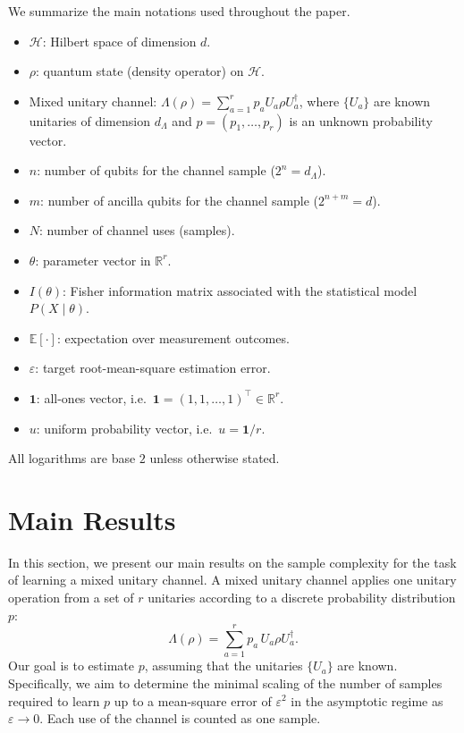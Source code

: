 \documentclass[12pt]{article}
\begin{document}
We summarize the main notations used throughout the paper.
\begin{itemize}
    \item $\mathcal{H}$: Hilbert space of dimension $d$.
    \item $\rho$: quantum state (density operator) on $\mathcal{H}$.
    \item Mixed unitary channel: $\Lambda(\rho) = \sum_{a=1}^r p_a U_a \rho U_a^\dagger$, where $\{U_a\}$ are known unitaries of dimension $d_\Lambda$ and $p = (p_1, \ldots, p_r)$ is an unknown probability vector.
    \item $n$: number of qubits for the channel sample ($2^n = d_\Lambda$).
    \item $m$: number of ancilla qubits for the channel sample ($2^{n+m} = d$).
    \item $N$: number of channel uses (samples).
    \item $\theta$: parameter vector in $\mathbb{R}^r$.
    \item $I(\theta)$: Fisher information matrix associated with the statistical model $P(X\mid \theta)$.
    \item $\mathbb{E}[\cdot]$: expectation over measurement outcomes.
    \item $\varepsilon$: target root-mean-square estimation error.
    \item $\mathbf{1}$: all-ones vector, i.e.\ $\mathbf{1} = (1,1,\ldots,1)^\top \in \mathbb{R}^r$.
    \item $u$: uniform probability vector, i.e.\ $u = \mathbf{1}/r$.
\end{itemize}
All logarithms are base $2$ unless otherwise stated.

\section{Main Results}

In this section, we present our main results on the sample complexity for the task of learning a mixed unitary channel. A mixed unitary channel applies one unitary operation from a set of $r$ unitaries according to a discrete probability distribution $p$:
\begin{equation}
    \Lambda(\rho) = \sum_{a=1}^r p_a\, U_a \rho U_a^\dagger.
\end{equation}
Our goal is to estimate $p$, assuming that the unitaries $\{U_a\}$ are known. Specifically, we aim to determine the minimal scaling of the number of samples required to learn $p$ up to a mean-square error of $\varepsilon^2$ in the asymptotic regime as $\varepsilon \rightarrow 0$. Each use of the channel is counted as one sample.
\end{document}
